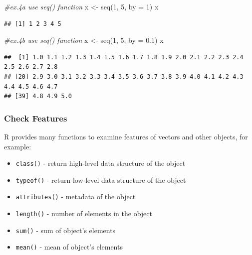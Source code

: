 \documentclass[
]{article}
\newenvironment{Shaded}{\begin{snugshade}}{\end{snugshade}}
\newcommand{\AttributeTok}[1]{\textcolor[rgb]{0.77,0.63,0.00}{#1}}
\newcommand{\CommentTok}[1]{\textcolor[rgb]{0.56,0.35,0.01}{\textit{#1}}}
\newcommand{\DecValTok}[1]{\textcolor[rgb]{0.00,0.00,0.81}{#1}}
\newcommand{\FloatTok}[1]{\textcolor[rgb]{0.00,0.00,0.81}{#1}}
\newcommand{\FunctionTok}[1]{\textcolor[rgb]{0.00,0.00,0.00}{#1}}
\newcommand{\NormalTok}[1]{#1}
\newcommand{\OtherTok}[1]{\textcolor[rgb]{0.56,0.35,0.01}{#1}}
\providecommand{\tightlist}{%
  \setlength{\itemsep}{0pt}\setlength{\parskip}{0pt}}
\begin{document}
\begin{Shaded}
\begin{Highlighting}[]
\CommentTok{\#ex.4a use seq() function}
\NormalTok{x }\OtherTok{\textless{}{-}} \FunctionTok{seq}\NormalTok{(}\DecValTok{1}\NormalTok{, }\DecValTok{5}\NormalTok{, }\AttributeTok{by =} \DecValTok{1}\NormalTok{)}
\NormalTok{x}
\end{Highlighting}
\end{Shaded}

\begin{verbatim}
## [1] 1 2 3 4 5
\end{verbatim}

\begin{Shaded}
\begin{Highlighting}[]
\CommentTok{\#ex.4b use seq() function}
\NormalTok{x }\OtherTok{\textless{}{-}} \FunctionTok{seq}\NormalTok{(}\DecValTok{1}\NormalTok{, }\DecValTok{5}\NormalTok{, }\AttributeTok{by =} \FloatTok{0.1}\NormalTok{)}
\NormalTok{x}
\end{Highlighting}
\end{Shaded}

\begin{verbatim}
##  [1] 1.0 1.1 1.2 1.3 1.4 1.5 1.6 1.7 1.8 1.9 2.0 2.1 2.2 2.3 2.4 2.5 2.6 2.7 2.8
## [20] 2.9 3.0 3.1 3.2 3.3 3.4 3.5 3.6 3.7 3.8 3.9 4.0 4.1 4.2 4.3 4.4 4.5 4.6 4.7
## [39] 4.8 4.9 5.0
\end{verbatim}

\hypertarget{check-features}{%
\subsubsection{Check Features}\label{check-features}}

R provides many functions to examine features of vectors and other objects, for example:

\begin{itemize}
\tightlist
\item
  \texttt{class()} - return high-level data structure of the object
\item
  \texttt{typeof()} - return low-level data structure of the object
\item
  \texttt{attributes()} - metadata of the object
\item
  \texttt{length()} - number of elements in the object
\item
  \texttt{sum()} - sum of object's elements
\item
  \texttt{mean()} - mean of object's elements
\end{itemize}
\end{document}

